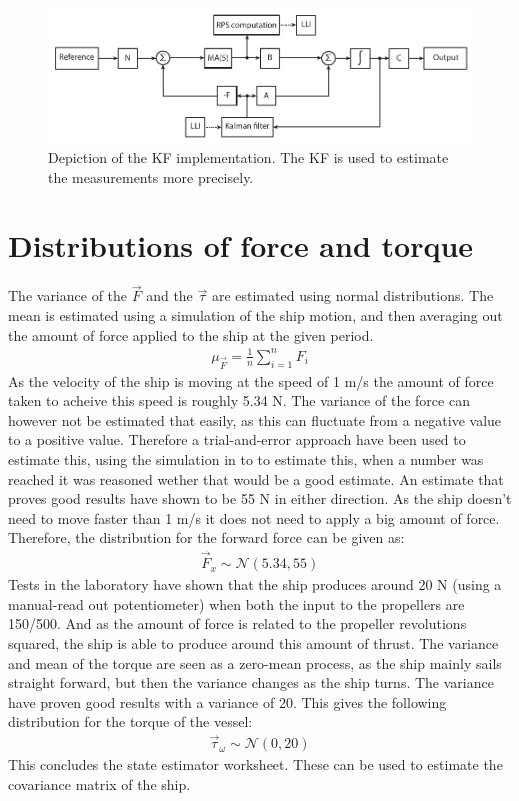 \begin{figure}[htbp]
	\centering
	\includegraphics[width=\textwidth]{img/kalmanim}
	\caption{Depiction of the \ac{KF} implementation. The \ac{KF} is used to estimate the measurements more precisely.}
	\label{fig:kalmanimp}
\end{figure}

\section{Distributions of force and torque}
The variance of the $\vec{F}$ and the $\vec{\tau}$ are estimated using normal distributions. The mean is estimated using a simulation of the ship motion, and then averaging out the amount of force applied to the ship at the given period. 
\begin{align}
\mu_{\vec{F}} = \frac{1}{n}\sum_{i = 1}^n F_i
\end{align}
As the velocity of the ship is moving at the speed of 1 m/s the amount of force taken to acheive this speed is roughly 5.34 N. The variance of the force can however not be estimated that easily, as this can fluctuate from a negative value to a positive value. Therefore a trial-and-error approach have been used to estimate this, using the simulation in \MATLAB to to estimate this, when a number was reached it was reasoned wether that would be a good estimate. An estimate that proves good results have shown to be 55 N in either direction. As the ship doesn't need to move faster than 1 m/s it does not need to apply a big amount of force. Therefore, the distribution for the forward force can be given as:
\begin{align}
\vec{F}_x \sim \mathcal{N}(5.34,55)
\end{align}
Tests in the laboratory have shown that the ship produces around 20 N (using a manual-read out potentiometer) when both the input to the propellers are 150/500. And as the amount of force is related to the propeller revolutions squared, the ship is able to produce around this amount of thrust. 
The variance and mean of the torque are seen as a zero-mean process, as the ship mainly sails straight forward, but then the variance changes as the ship turns. The variance have proven good results with a variance of 20. This gives the following distribution for the torque of the vessel:
\begin{align}
\vec{\tau}_\omega \sim \mathcal{N}(0,20)
\end{align}
This concludes the state estimator worksheet. These can be used to estimate the covariance matrix of the ship. 